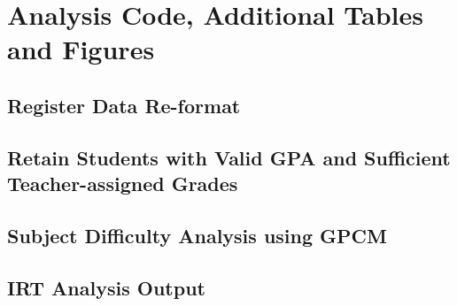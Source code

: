 \section{Analysis Code, Additional Tables and Figures}\label{app}

\subsection{Register Data Re-format}

\begin{singlespacing}
    
\end{singlespacing}

\subsection{Retain Students with Valid GPA and Sufficient Teacher-assigned Grades}

\begin{singlespacing}
    
\end{singlespacing}

\subsection{Subject Difficulty Analysis using GPCM}

\begin{singlespacing}
    
\end{singlespacing}

\newpage

\subsection{IRT Analysis Output}



\newpage
